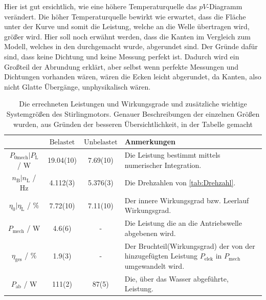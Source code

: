 \documentclass[11pt]{scrartcl}
\begin{document}
Hier ist gut ersichtlich, wie eine höhere Temperaturquelle das $pV$-Diagramm
verändert. Die höher Temperaturquelle bewirkt wie erwartet, dass die Fläche unter 
der Kurve und somit die Leistung, welche an die Welle übertragen wird, größer wird.
Hier soll noch erwähnt werden, dass die Kanten im Vergleich zum Modell, welches
in den  durchgemacht wurde, abgerundet sind.
Der Gründe dafür sind, dass keine Dichtung und keine Messung perfekt ist. Dadurch
wird ein Großteil der Abrundung erklärt, aber selbst wenn perfekte Messungen
und Dichtungen vorhanden wären, wären die Ecken leicht abgerundet, da Kanten,
also nicht Glatte Übergänge, unphysikalisch wären.

\begin{table}[H]
    \centering
    \caption{Die errechneten Leistungen und Wirkungsgrade und zusätzliche wichtige 
    Systemgrößen des Stirlingmotors. Genauer Beschreibungen der einzelnen
    Größen wurden, aus Gründen der besseren Übersichtlichkeit, in der Tabelle gemacht }
    \label{tab:leistungen_wirkungsgrade}
    \begin{tabular}{c|S[table-format=3.3(3)]|S[table-format=2.3(3)]|p{5cm}}
        {}                                             & $\text{Belastet}$ & $\text{Unbelastet}$ & Anmerkungen \\ \hline
        $P_{\text{0mech}} | P_{\text{L}}$ / W                 & 19.04(10)           & 7.69(10)              & Die Leistung bestimmt mittels numerischer Integration. \\
        $n_{\text{B}} | n_{\text{L}}$ / Hz                           & 4.112(3)          & 5.376(3)            & Die Drehzahlen von \autoref{tab:Drehzahl}. \\
        $\eta_{0} | \eta_{\text{L}}$ / \%                     & 7.72(10)            & 7.11(10)              & Der innere Wirkungsgrad bzw. Leerlauf Wirkungsgrad.  \\
        $P_{\text{mech}}$ / W                          & 4.6(6)            & {-}                 & Die Leistung die an die Antriebswelle abgebenen wird. \\
        $\eta_{\text{ges}}$ / \%                       & 1.9(3)            & {-}                 & Der Bruchteil(Wirkungsgrad) der von der hinzugefügten Leistung $P_{\text{elek}}$ in $P_{\text{mech}}$ umgewandelt wird. \\
        $P_{\text{ab}}$ / W                            & 111(2)            & 87(5)               & Die, über das Wasser abgeführte, Leistung. \\

\end{tabular}
\end{table}
\end{document}
